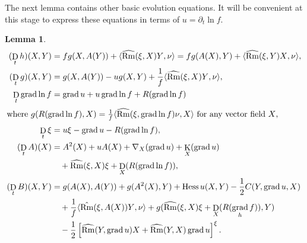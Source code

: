 \documentclass{amsart}
\newtheorem{lemma}[theorem]{Lemma}
\theoremstyle{definition}
\theoremstyle{remark}
\newcommand{\ip}[2]{\ensuremath{\langle{#1},{#2}\rangle}}
\DeclareMathOperator{\grad}{grad}
\DeclareMathOperator{\Rm}{Rm}
\DeclareMathOperator{\hess}{Hess}
\DeclareMathOperator{\diff}{K}
\DeclareMathOperator{\D}{D}
\numberwithin{equation}{section}
\begin{document}
The next lemma contains other basic evolution equations. It will be convenient at this stage to express these equations in terms of $u = \partial_t \ln f$.
\begin{lemma}
\begin{align*}
(\D_t h) (X, Y) &= f g(X, A(Y)) + \ip{\widehat{\Rm}(\xi, X) Y}{\nu} =  f g(A(X), Y) + \ip{\widehat{\Rm}(\xi, Y) X}{\nu}, \\
(\D_t g) (X, Y) &= g(X, A(Y)) - u g(X, Y) + \frac{1}{f} \ip{\widehat{\Rm}(\xi, X) Y}{\nu}, \\
\D_t \grad \ln f &= \grad u + u \grad \ln f + R(\grad \ln f) \\
\intertext{where $g(R({\grad \ln f}), X) = \frac{1}{f} \ip{\widehat{\Rm}(\xi, \grad \ln f) \nu}{X}$ for any vector field $X$,}
\D_t \xi &= u\xi - \grad u - R(\grad \ln f), \\
(\D_t A)(X) &= A^2(X) + u A(X) + \nabla_X (\grad u) + \diff_X (\grad u) \\
&\quad + \widehat{\Rm} (\xi, X) \xi + \D_X (R(\grad \ln f)), \\
(\D_t B) (X, Y) &= g(A(X), A(Y)) + g(A^2(X), Y) + \hess u (X, Y) -\frac{1}{2} C(Y, \grad u, X) \\
&\quad +\frac{1}{f} \ip{\hat{\Rm} (\xi, A(X))Y}{\nu} + g(\widehat{\Rm}(\xi, X)\xi  + \D_X (R(\grad_h f)), Y) \\
&\quad -\frac{1}{2} \left[\widehat{\Rm} (Y, \grad u)X +  \widehat{\Rm} (Y, X) \grad u\right]^{\xi}.
\end{align*}
\end{lemma}
\end{document}

